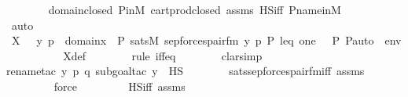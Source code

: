 \begin{isabellebody}
\ \ \ \ \ \ \isamarkupfalse%
\ domain{\isacharunderscore}{\kern0pt}closed\ P{\isacharunderscore}{\kern0pt}in{\isacharunderscore}{\kern0pt}M\ cartprod{\isacharunderscore}{\kern0pt}closed\ assms\ HS{\isacharunderscore}{\kern0pt}iff\ P{\isacharunderscore}{\kern0pt}name{\isacharunderscore}{\kern0pt}in{\isacharunderscore}{\kern0pt}M\isanewline
\ \ \ \ \ \ \isamarkupfalse%
\ auto\isanewline
\isanewline
\ \ \ \ \isamarkupfalse%
\ {\isachardoublequoteopen}X\ {\isacharequal}{\kern0pt}\ {\isacharbraceleft}{\kern0pt}\ {\isacharless}{\kern0pt}y{\isacharcomma}{\kern0pt}\ p{\isachargreater}{\kern0pt}\ {\isasymin}\ domain{\isacharparenleft}{\kern0pt}x{\isacharparenright}{\kern0pt}\ {\isasymtimes}\ P{\isachardot}{\kern0pt}\ sats{\isacharparenleft}{\kern0pt}M{\isacharcomma}{\kern0pt}\ sep{\isacharunderscore}{\kern0pt}forces{\isacharunderscore}{\kern0pt}pair{\isacharunderscore}{\kern0pt}fm{\isacharparenleft}{\kern0pt}{\isasymphi}{\isacharparenright}{\kern0pt}{\isacharcomma}{\kern0pt}\ {\isacharbrackleft}{\kern0pt}{\isacharless}{\kern0pt}y{\isacharcomma}{\kern0pt}\ p{\isachargreater}{\kern0pt}{\isacharcomma}{\kern0pt}\ P{\isacharcomma}{\kern0pt}\ leq{\isacharcomma}{\kern0pt}\ one{\isacharcomma}{\kern0pt}\ {\isacharless}{\kern0pt}{\isasymF}{\isacharcomma}{\kern0pt}\ {\isasymG}{\isacharcomma}{\kern0pt}\ P{\isacharcomma}{\kern0pt}\ P{\isacharunderscore}{\kern0pt}auto{\isachargreater}{\kern0pt}{\isacharbrackright}{\kern0pt}\ {\isacharat}{\kern0pt}\ env{\isacharparenright}{\kern0pt}\ {\isacharbraceright}{\kern0pt}{\isachardoublequoteclose}\ \isanewline
\ \ \ \ \ \ \isamarkupfalse%
\ X{\isacharunderscore}{\kern0pt}def\ \isanewline
\ \ \ \ \ \ \isamarkupfalse%
{\isacharparenleft}{\kern0pt}rule\ iff{\isacharunderscore}{\kern0pt}eq{\isacharparenright}{\kern0pt}\isanewline
\ \ \ \ \ \ \isamarkupfalse%
\ clarsimp\isanewline
\ \ \ \ \ \ \isamarkupfalse%
{\isacharparenleft}{\kern0pt}rename{\isacharunderscore}{\kern0pt}tac\ y\ p\ q{\isacharcomma}{\kern0pt}\ subgoal{\isacharunderscore}{\kern0pt}tac\ {\isachardoublequoteopen}y\ {\isasymin}\ HS{\isachardoublequoteclose}{\isacharparenright}{\kern0pt}\isanewline
\ \ \ \ \ \ \isamarkupfalse%
\ sats{\isacharunderscore}{\kern0pt}sep{\isacharunderscore}{\kern0pt}forces{\isacharunderscore}{\kern0pt}pair{\isacharunderscore}{\kern0pt}fm{\isacharunderscore}{\kern0pt}iff\ assms\ \isanewline
\ \ \ \ \ \ \ \isamarkupfalse%
\ force\ \isanewline
\ \ \ \ \ \ \isamarkupfalse%
\ HS{\isacharunderscore}{\kern0pt}iff\ assms\ \isanewline

\end{isabellebody}
